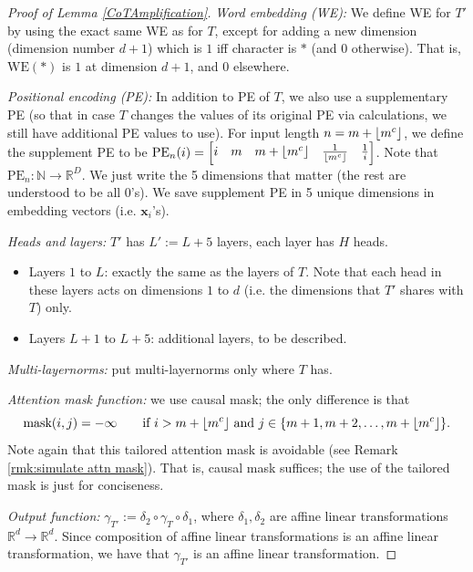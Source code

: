\documentclass{article}
\theoremstyle{definition}
\DeclarePairedDelimiter{\floor}{\lfloor}{\rfloor}
\newcommand{\R}{\mathbb{R}}
\newcommand{\N}{\mathbb{N}}
\newcommand{\x}{\mathbf{x}}
\newcommand{\0}{\mathbf{0}}
\newcommand{\mask}{\text{mask}}
\newcommand{\WE}{\text{WE}}
\newcommand{\PE}{\text{PE}}
\newcommand{\1}{\mathbbm{1}}
\begin{document}
\begin{proof}[Proof of Lemma \ref{CoTAmplification}]
{\em Word embedding (WE):} We define WE for $T'$ by using the exact same WE as for $T$, except for adding a new dimension (dimension number $d+1$) which is $1$ iff character is $*$ (and $0$ otherwise). That is, $\WE(*)$ is $1$ at dimension $d+1$, and $0$ elsewhere.

{\em Positional encoding (PE):} In addition to PE of $T$, we also use a supplementary PE (so that in case $T$ changes the values of its original PE via calculations, we still have additional PE values to use). For input length $n = m + \floor{m^c}$, we define the supplement PE to be $\PE_n(i) = \begin{bmatrix}
            i &m & m+\floor{m^c} &\frac{1}{\floor{m^c}} &\frac{1}{i}
        \end{bmatrix}$. Note that $\PE_n : \N \to \R^D$. We just write the 5 dimensions that matter (the rest are understood to be all $0$'s). We save supplement PE in 5 unique dimensions in embedding vectors (i.e. $\x_i$'s).

        {\em Heads and layers:} $T'$ has $L' := L+5$ layers, each layer has $H$ heads.  
        \begin{itemize}[noitemsep,leftmargin=10pt,topsep=2pt]
            \item Layers $1$ to $L$: exactly the same as the layers of $T$. Note that each head in these layers acts on dimensions $1$ to $d$ (i.e. the dimensions that $T'$ shares with $T$) only.
            \item Layers $L+1$ to $L+5$: additional layers, to be described.
        \end{itemize}

        {\em Multi-layernorms:} put multi-layernorms only where $T$ has.

        {\em Attention mask function:} we use causal mask; the only difference is that 
        \begin{equation*}
            \mask(i, j) = - \infty \qquad\text{if $i > m + \floor{m^c}$ and $j \in \{m+1, m+2, \dots, m+\floor{m^c}\}$.}
        \end{equation*}
        Note again that this tailored attention mask is avoidable (see Remark \ref{rmk:simulate attn mask}). That is, causal mask suffices; the use of the tailored mask is just for conciseness.

        {\em Output function:} $\gamma_{T'} := \delta_2 \circ \gamma_T \circ \delta_1$, where $\delta_1, \delta_2$ are affine linear transformations $\R^d \to \R^d$. Since composition of affine linear transformations is an affine linear transformation, we have that $\gamma_{T'}$ is an affine linear transformation.    



\end{proof}
\end{document}
